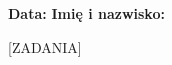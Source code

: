 \documentclass[addpoints]{exam}
\begin{document}
\raggedleft \textbf {Data:\enspace\makebox[2in]{\hrulefill}} 
\hfill  \textbf{Imię i nazwisko: \enspace\makebox[2in]{\hrulefill}}
	
\vspace{0.1in}

	\begin{questions}

	[ZADANIA]

	\end{questions}
\end{document}
